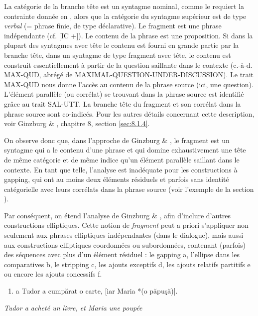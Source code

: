 La catégorie de la branche tête est un syntagme nominal, comme le requiert la contrainte donnée en , alors que la catégorie du syntagme supérieur est de type \textit{verbal} (= phrase finie, de type déclarative). Le fragment est une phrase indépendante (cf. [IC +]). Le contenu de la phrase est une proposition. Si dans la plupart des syntagmes avec tête le contenu est fourni en grande partie par la branche tête, dans un syntagme de type fragment avec tête, le contenu est construit essentiellement à partir de la question saillante dans le contexte (c.-à-d. MAX-QUD, abrégé de MAXIMAL-QUESTION-UNDER-DISCUSSION). Le trait MAX-QUD nous donne l'accès au contenu de la phrase source (ici, une question). L'élément parallèle (ou corrélat) se trouvant dans la phrase source est identifié grâce au trait SAL-UTT. La branche tête du fragment et son corrélat dans la phrase source sont co-indicés. Pour les autres détails concernant cette description, voir Ginzburg \& \citet{Sag2000}, chapitre 8, section \ref{sec:8.1.4}.

On observe donc que, dans l'approche de Ginzburg \& \citet{Sag2000}, le fragment est un syntagme qui a le contenu d'une phrase et qui domine exhaustivement une tête de même catégorie et de même indice qu'un élément parallèle saillant dans le contexte. En tant que telle, l'analyse est inadéquate pour les constructions à gapping, qui ont au moins deux éléments résiduels et parfois sans identité catégorielle avec leurs corrélats dans la phrase source (voir l'exemple  de la section ).  

Par conséquent, on étend l'analyse de Ginzburg \& \citet{Sag2000}, afin d'inclure d'autres constructions elliptiques. Cette notion de \textit{fragment} peut a priori s'appliquer non seulement aux phrases elliptiques indépendantes (dans le dialogue), mais aussi aux constructions elliptiques coordonnées ou subordonnées, contenant (parfois) des séquences avec plus d'un élément résiduel : le gapping a, l'ellipse dans les comparatives b, le stripping c, les ajouts exceptifs d, les ajouts relatifs partitifs e ou encore les ajouts concessifs f. 


\begin{enumerate}
\item \label{bkm:Ref299730672}a  Tudor a cumpărat o carte, [iar Maria *(o păpuşă)].


\end{enumerate}
{\itshape
Tudor a acheté un livre, et Maria une poupée}

